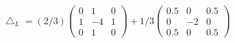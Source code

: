 \documentclass[12pt]{standalone}
\begin{document}
$\displaystyle 
\bigtriangleup_{L}=(2/3)
\begin{pmatrix}
  0 & 1 & 0 \\
  1 & -4 & 1 \\
  0 & 1 & 0
\end{pmatrix}
+1/3
\begin{pmatrix}
  0.5 & 0 & 0.5 \\
  0 & -2 & 0 \\
  0.5 & 0 & 0.5
\end{pmatrix}
$
\end{document}
